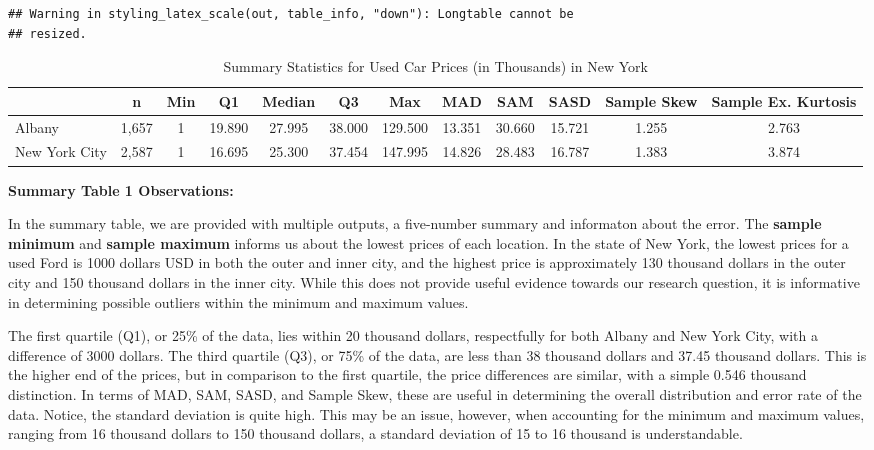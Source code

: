 \documentclass[
]{article}
\begin{document}
\begin{verbatim}
## Warning in styling_latex_scale(out, table_info, "down"): Longtable cannot be
## resized.
\end{verbatim}

\begingroup\fontsize{12}{14}\selectfont

\begin{longtable}[t]{lccccccccccc}
\caption{\label{tab:unnamed-chunk-11}Summary Statistics for Used Car Prices (in Thousands) in New York}\\
\toprule
 & n & Min & Q1 & Median & Q3 & Max & MAD & SAM & SASD & Sample Skew & Sample Ex. Kurtosis\\
\midrule
Albany & 1,657 & 1 & 19.890 & 27.995 & 38.000 & 129.500 & 13.351 & 30.660 & 15.721 & 1.255 & 2.763\\
New York City & 2,587 & 1 & 16.695 & 25.300 & 37.454 & 147.995 & 14.826 & 28.483 & 16.787 & 1.383 & 3.874\\
\bottomrule
\end{longtable}
\endgroup{}

\textbf{Summary Table 1 Observations:}

In the summary table, we are provided with multiple outputs, a
five-number summary and informaton about the error. The \textbf{sample
minimum} and \textbf{sample maximum} informs us about the lowest prices
of each location. In the state of New York, the lowest prices for a used
Ford is 1000 dollars USD in both the outer and inner city, and the
highest price is approximately 130 thousand dollars in the outer city
and 150 thousand dollars in the inner city. While this does not provide
useful evidence towards our research question, it is informative in
determining possible outliers within the minimum and maximum values.

The first quartile (Q1), or 25\% of the data, lies within 20 thousand
dollars, respectfully for both Albany and New York City, with a
difference of 3000 dollars. The third quartile (Q3), or 75\% of the
data, are less than 38 thousand dollars and 37.45 thousand dollars. This
is the higher end of the prices, but in comparison to the first
quartile, the price differences are similar, with a simple 0.546
thousand distinction. In terms of MAD, SAM, SASD, and Sample Skew, these
are useful in determining the overall distribution and error rate of the
data. Notice, the standard deviation is quite high. This may be an
issue, however, when accounting for the minimum and maximum values,
ranging from 16 thousand dollars to 150 thousand dollars, a standard
deviation of 15 to 16 thousand is understandable.
\end{document}
